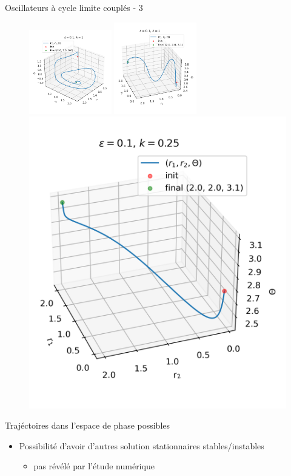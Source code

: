 \begin{frame}{Oscillateurs à cycle limite couplés - 3}

  \begin{figure}
      \includegraphics[width=0.32\textwidth]{images/couplee/phase_traj_eps=0.1_k=1_X0=[0.038, -0.018, 0.265, -0.486].png}
      \hfill
      \includegraphics[width=0.32\textwidth]{images/couplee/phase_traj_eps=0.1_k=1_X0=[-0.02, 0.01, 0.04, 0].png}
      \hfill
      \includegraphics[width=0.32
      \textwidth]{images/couplee/phase_traj_eps=0.1_k=0.25_X0=[-0.02, 0.01, 0.04, 0].png}
  \end{figure}
  \begin{center}{\tiny Trajéctoires dans l'espace de phase possibles}\end{center}
  \begin{itemize}
    \item Possibilité d'avoir d'autres solution stationnaires stables/instables
    \begin{itemize}
      \item pas révélé par l'étude numérique
    \end{itemize}
  \end{itemize}
\end{frame}

